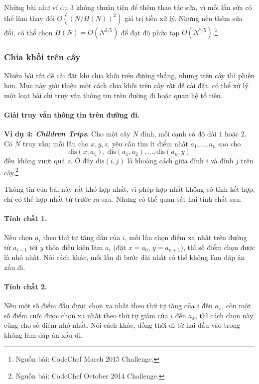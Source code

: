 \documentclass[11pt]{article}
\begin{document}
Những bài như ví dụ 3 không thuận tiện để thêm thao tác sửa, vì mỗi lần sửa có
thể làm thay đổi \(O((N/H(N))^2)\) giá trị tiền xử lý. Nhưng nếu thêm sửa đổi,
có thể chọn \(H(N)=O(N^{3/5})\) để đạt độ phức tạp \(O(N^{7/5})\).\footnote{Nguồn
bài: CodeChef March 2015 Challenge.}

\subsubsection{Chia khối trên cây}

Nhiều bài rất dễ cài đặt khi chia khối trên đường thẳng, nhưng trên cây thì
phiền hơn. Mục này giới thiệu một cách chia khối trên cây rất dễ cài đặt, có
thể xử lý một loạt bài chỉ truy vấn thông tin trên đường đi hoặc quan hệ tổ
tiên.

\paragraph{Giải truy vấn thông tin trên đường đi.}
\textbf{Ví dụ 4: \emph{Children Trips}.} Cho một cây \(N\) đỉnh, mỗi cạnh có
độ dài \(1\) hoặc \(2\). Có \(N\) truy vấn; mỗi lần cho \(x,y,z\), yêu cầu tìm
ít điểm nhất \(a_1,\ldots,a_n\) sao cho
\[
  \mathrm{dis}(x,a_1),\ \mathrm{dis}(a_1,a_2),\ldots,\mathrm{dis}(a_n,y)
\]
đều không vượt quá \(z\). Ở đây \(\mathrm{dis}(i,j)\) là khoảng cách giữa đỉnh
\(i\) và đỉnh \(j\) trên cây.\footnote{Nguồn bài: CodeChef October 2014
Challenge.}

Thông tin của bài này rất khó hợp nhất, vì phép hợp nhất không có tính kết hợp,
chỉ có thể hợp nhất từ trước ra sau. Nhưng có thể quan sát hai tính chất sau.

\paragraph{Tính chất 1.}
Nếu chọn \(a_i\) theo thứ tự tăng dần của \(i\), mỗi lần chọn điểm xa nhất trên
đường từ \(a_{i-1}\) tới \(y\) thỏa điều kiện làm \(a_i\) (đặt \(x=a_0\),
\(y=a_{n+1}\)), thì số điểm chọn được là nhỏ nhất. Nói cách khác, mỗi lần đi
bước dài nhất có thể không làm đáp án xấu đi.

\paragraph{Tính chất 2.}
Nếu một số điểm đầu được chọn xa nhất theo thứ tự tăng của \(i\) đến \(a_x\),
còn một số điểm cuối được chọn xa nhất theo thứ tự giảm của \(i\) đến \(a_x\),
thì cách chọn này cũng cho số điểm nhỏ nhất. Nói cách khác, đồng thời đi từ hai
đầu vào trong không làm đáp án xấu đi.
\end{document}
